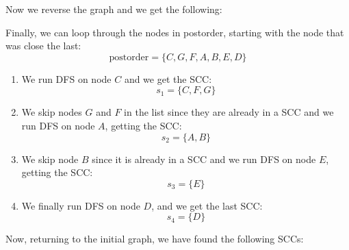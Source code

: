 Now we reverse the graph and we get the following:
\begin{figure}[h]
\centering
{}
\end{figure}


Finally, we can loop through the nodes in postorder, starting with the node
that was close the last:
\[
	\mathrm{postorder}=\{C,G,F,A,B,E,D\}
\]
\newpage
\begin{enumerate}
\def \itemsep{0pt}
	\item We run DFS on node $C$ and we get the SCC:
		\[
			s_1=\{C,F,G\}
		\]
	\item We skip nodes $G$ and $F$ in the list since they are already in
		a SCC and we run DFS on node $A$, getting the SCC:
		\[
			s_2=\{A,B\}	
		\]

	\item We skip node $B$ since it is already in a SCC and we 
		run DFS on node $E$, getting the SCC:
		\[
			s_3=\{E\}
		\]
	\item We finally run DFS on node $D$, and we get the last SCC:
		\[
			s_4=\{D\}
		\]
\end{enumerate}
Now, returning to the initial graph, we have found the following SCCs:

